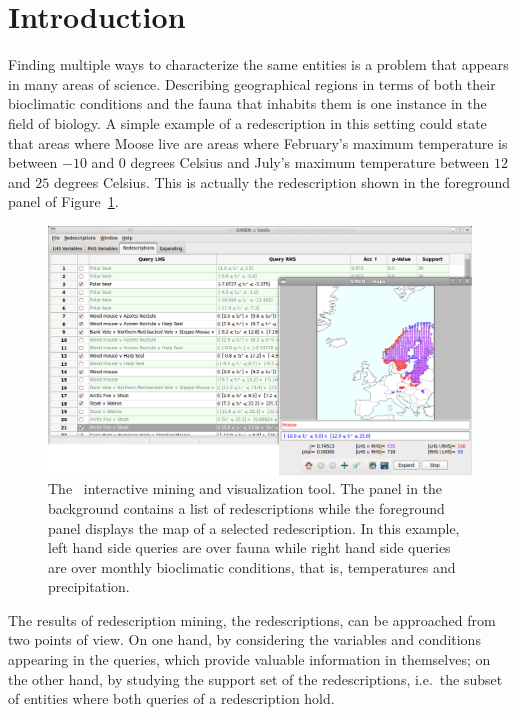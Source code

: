 \section{Introduction}

Finding multiple ways to characterize the same entities is a problem
that appears in many areas of science. Describing geographical regions in terms of both their
bioclimatic conditions and the fauna that inhabits them is one
instance in the field of biology.  A simple example of a redescription in this setting could
state that areas where Moose live are areas where February's maximum
temperature is between $-10$ and $0$ degrees Celsius and July's
maximum temperature between $12$ and $25$ degrees Celsius.
This is actually the redescription shown in the foreground panel of
Figure~\ref{fig:both_panels}.

\begin{figure}[t]
  \centering
\includegraphics[width=\textwidth]{screenshots/both_panels_02}
  \caption{The \Siren\ interactive mining and visualization tool. The panel in the background contains a list of redescriptions while the foreground panel displays the map of a selected redescription.  In this example, left hand side queries are over fauna while right hand side queries are over monthly bioclimatic conditions, that is, temperatures and precipitation.}
  \label{fig:both_panels}
\end{figure}

The results of redescription mining, the redescriptions, can be
approached from two points of view. On one hand, by considering the
variables and conditions appearing in the queries, which provide
valuable information in themselves; on the other hand, by studying the
support set of the redescriptions, i.e.\ the subset of entities where
both queries of a redescription hold. 
 
